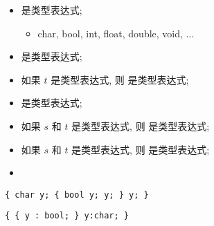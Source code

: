 \begin{frame}{}
  \begin{center}
    \begin{definition}
      \begin{itemize}
        \setlength{\itemsep}{12pt}
        \item {}是类型表达式;
          \begin{itemize}
            \item char, bool, int, float, double, void, $\dots$
          \end{itemize}
        \item {}是类型表达式;
        \pause
        \item 如果 $t$ 是类型表达式, 则  是类型表达式;
        \item {} 是类型表达式;
        \pause
        \item 如果 $s$ 和 $t$ 是类型表达式, 则  是类型表达式;
        \item 如果 $s$ 和 $t$ 是类型表达式, 则  是类型表达式;
        \pause
        \item {}
      \end{itemize}
    \end{definition}
  \end{center}
\end{frame}

\begin{frame}{}
  \begin{center}
  \end{center}
\end{frame}

\begin{frame}{}
  \begin{center}
    \texttt{\{ char y; \{ bool y; y; \} y; \}}

    \vspace{0.80cm}
    \texttt{\{ \{ y : bool; \} y:char; \}}
  \end{center}
\end{frame}

\begin{frame}{}
  \begin{center}
  \end{center}
\end{frame}

